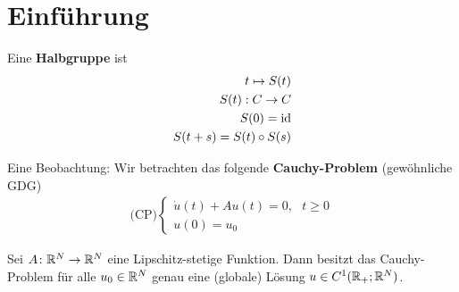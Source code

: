 
\setcounter{chapter}{-1}

\chapter{Einführung}
Eine \textbf{Halbgruppe} ist
\begin{align*}
	t\mapsto S(t)\\
	S(t):C\to C\\
	S(0)=\operatorname{id}\\
	S(t+s)=S(t)\circ S(s)
\end{align*}

Eine Beobachtung: Wir betrachten das folgende \textbf{Cauchy-Problem} (gewöhnliche GDG)
\begin{align}\label{CauchyProblem0}\tag{CP}
	(\text{CP)}\left\lbrace\begin{array}{cl}
		\dot{u}(t)+Au(t)=0,~~~t\geq0\\
		u(0) =u_0
	\end{array}\right.
\end{align}

\begin{theorem}
	Sei $A\colon\mathbb{R}^N\to\mathbb{R}^N$ eine Lipschitz-stetige Funktion. 
	Dann besitzt das Cauchy-Problem für alle $u_0\in\mathbb{R}^N$ genau eine (globale) Lösung $u\in C^1(\mathbb{R}_+;\mathbb{R}^N)$.
\end{theorem}


